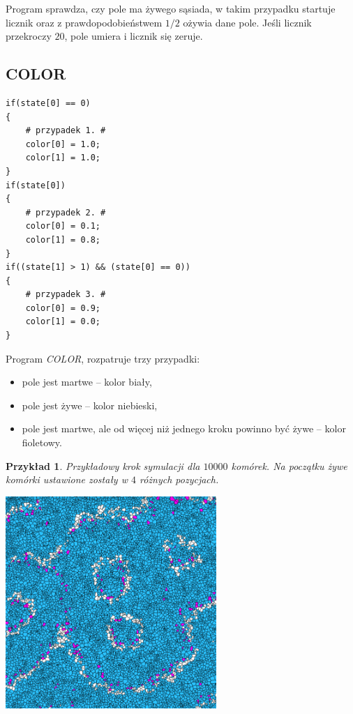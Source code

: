 \documentclass[declaration,shortabstract, inz]{iithesis}
\theoremstyle{definition} \newtheorem{definition}{Definicja}[]
\theoremstyle{plain} \newtheorem{remark}[definition]{Obserwacja}
\theoremstyle{plain} \newtheorem{theorem}[definition]{Twierdzenie}
\theoremstyle{plain} \newtheorem{example}{Przykład}[definition]
\theoremstyle{plain} \newtheorem{lemma}[definition]{Lemat}
\begin{document}
Program sprawdza, czy pole ma żywego sąsiada, w takim przypadku startuje licznik oraz  z prawdopodobieństwem $1/2$ ożywia dane pole. Jeśli licznik przekroczy $20$, pole umiera i licznik się zeruje.

\subsection{COLOR}

\begin{center}
\begin{lstlisting}
if(state[0] == 0)
{
    # przypadek 1. #
    color[0] = 1.0;
    color[1] = 1.0;
}
if(state[0])
{
    # przypadek 2. #
    color[0] = 0.1;
    color[1] = 0.8;
}
if((state[1] > 1) && (state[0] == 0))
{
    # przypadek 3. #
    color[0] = 0.9;
    color[1] = 0.0;
}
\end{lstlisting}
\end{center}
Program \textit{COLOR}, rozpatruje trzy przypadki: 
\begin{itemize}
\item pole jest martwe -- kolor biały,
\item pole jest żywe -- kolor niebieski,
\item pole jest martwe, ale od więcej niż jednego kroku powinno być żywe -- kolor fioletowy.
\end{itemize}

\begin{example}
Przykładowy krok symulacji dla $10000$ komórek. Na początku żywe komórki ustawione zostały w $4$ różnych pozycjach.
	\begin{center}
		\includegraphics[width=0.6\textwidth]{sim1}
	\end{center}
\end{example}
\end{document}
